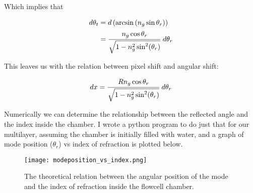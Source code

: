 Which implies that

\begin{equation*}
\begin{split}
	d\theta_t & = d\left(\arcsin\left(n_g \sin{\theta_r}\right)\right) \\
			  & = \cfrac{n_g \cos{\theta_r}}{\sqrt{1-n_g^2 \sin^{2}(\theta_r)}}\,\,d\theta_r
\end{split}
\end{equation*}

This leaves us with the relation between pixel shift and angular shift:

\begin{equation}
	dx = \cfrac{R n_g \cos{\theta_r}}{\sqrt{1-n_g^2 \sin^{2}(\theta_r)}} \,\,d\theta_r
\end{equation}

Numerically we can determine the relationship between the reflected angle and the index inside the chamber. I wrote a python program to do just that for our multilayer, assuming the chamber is initially filled with water, and a graph of mode position ($\theta_r$) vs index of refraction is plotted below.

\begin{figure}[h]
\begin{center}
\texttt{[image: modeposition\_vs\_index.png]}
\caption{The theoretical relation between the angular position of the mode and the index of refraction inside the flowcell chamber. }
\label{fig:modevsindex}
\end{center}
\end{figure}